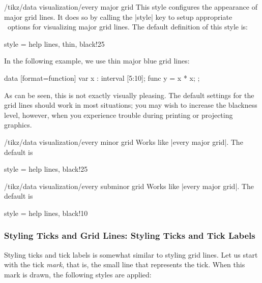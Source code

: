 \begin{stylekey}{/tikz/data visualization/every major grid}
  This style configures the appearance of major grid lines. It does so
  by calling the |style| key to setup appropriate \tikzname\ options
  for visualizing major grid lines. The default definition of this
  style is:
\begin{codeexample}
style = {help lines, thin, black!25}
\end{codeexample}
  In the following example, we use thin major blue grid lines:
\begin{codeexample}[]
\tikz \datavisualization
  [scientific axes,
   all axes={
     length=3cm,
     grid,
     grid={minor steps between steps}
   },
   every major grid/.style = {style={blue, thin}},
   visualize as line]
  data [format=function] {
    var x : interval [5:10];
    func y = \value x * \value x;
  };
\end{codeexample}   
  As can be seen, this is not exactly visually pleasing. The default
  settings for the grid lines should work in most situations; you may
  wish to increase the blackness level, however, when you experience
  trouble during printing or projecting graphics.
\end{stylekey}

\begin{stylekey}{/tikz/data visualization/every minor grid}
  Works like |every major grid|. The default is
\begin{codeexample}
style = {help lines, black!25}
\end{codeexample}
\end{stylekey}

\begin{stylekey}{/tikz/data visualization/every subminor grid}
  Works like |every major grid|. The default is
\begin{codeexample}
style = {help lines, black!10}
\end{codeexample}
\end{stylekey}



\subsubsection{Styling Ticks and Grid Lines: Styling Ticks and Tick Labels}

\label{section-dv-styling-ticks}

Styling ticks and tick labels is somewhat similar to styling grid
lines. Let us start with the tick \emph{mark}, that is, the small line
that represents the tick. When this mark is drawn, the following styles are applied:

